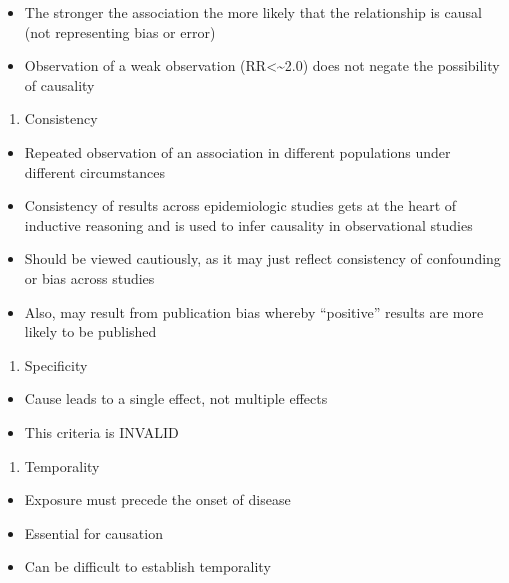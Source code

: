 \documentclass[
]{book}
\providecommand{\tightlist}{%
  \setlength{\itemsep}{0pt}\setlength{\parskip}{0pt}}
\begin{document}
\begin{itemize}
\tightlist
\item
  The stronger the association the more likely that the relationship is causal (not representing bias or error)
\item
  Observation of a weak observation (RR\textless\textasciitilde2.0) does not negate the possibility of causality
\end{itemize}

\begin{enumerate}
\def\labelenumi{\arabic{enumi}.}
\setcounter{enumi}{1}
\tightlist
\item
  Consistency
\end{enumerate}

\begin{itemize}
\tightlist
\item
  Repeated observation of an association in different populations under different circumstances
\item
  Consistency of results across epidemiologic studies gets at the heart of inductive reasoning and is used to infer causality in observational studies
\item
  Should be viewed cautiously, as it may just reflect consistency of confounding or bias across studies
\item
  Also, may result from publication bias whereby ``positive'' results are more likely to be published
\end{itemize}

\begin{enumerate}
\def\labelenumi{\arabic{enumi}.}
\setcounter{enumi}{2}
\tightlist
\item
  Specificity
\end{enumerate}

\begin{itemize}
\tightlist
\item
  Cause leads to a single effect, not multiple effects
\item
  This criteria is INVALID
\end{itemize}

\begin{enumerate}
\def\labelenumi{\arabic{enumi}.}
\setcounter{enumi}{3}
\tightlist
\item
  Temporality
\end{enumerate}

\begin{itemize}
\tightlist
\item
  Exposure must precede the onset of disease
\item
  Essential for causation
\item
  Can be difficult to establish temporality
\end{itemize}
\end{document}
